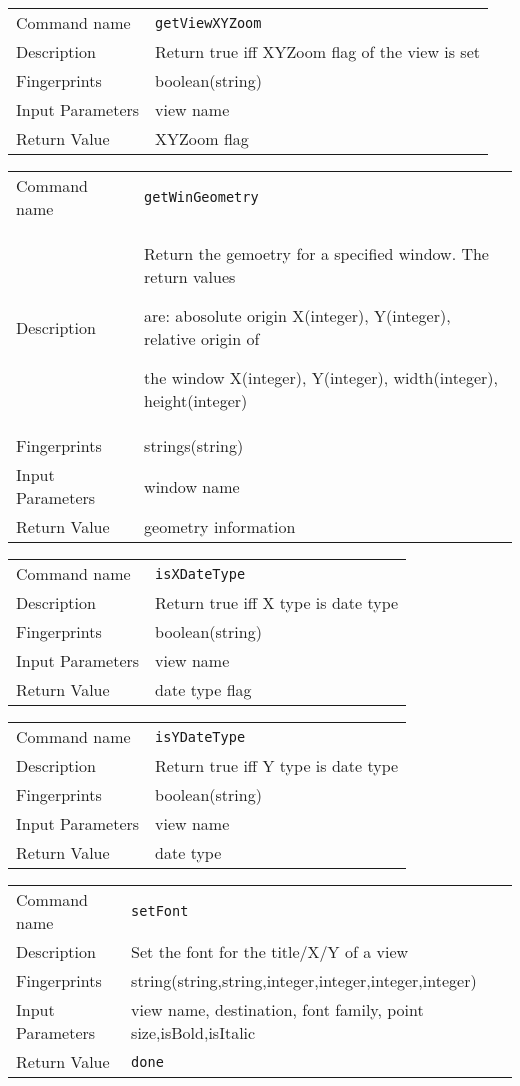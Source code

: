 \noindent
\begin{tabular}{l|p{5in}}
\hline
Command name &{\tt getViewXYZoom }\\ 
Description &
Return true iff XYZoom flag of the view is set
 	\\
Fingerprints & boolean(string)\\
Input Parameters& view name\\
Return Value&XYZoom flag\\
\hline
\end{tabular}
\bigskip

\noindent
\begin{tabular}{l|p{5in}}
\hline
Command name &{\tt getWinGeometry }\\ 
Description &
Return the gemoetry for a specified window. The return values 
 
are: abosolute origin X(integer), Y(integer), relative origin of
 
the window X(integer), Y(integer), width(integer), height(integer)
 	\\
Fingerprints & strings(string)\\
Input Parameters&window name\\
Return Value&geometry information\\
\hline
\end{tabular}
\bigskip

\noindent
\begin{tabular}{l|p{5in}}
\hline
Command name &{\tt isXDateType }\\ 
Description &
Return true iff X type is date type
 	\\
Fingerprints & boolean(string)\\
Input Parameters&view name\\
Return Value&date type flag\\
\hline
\end{tabular}
\bigskip

\noindent
\begin{tabular}{l|p{5in}}
\hline
Command name &{\tt isYDateType }\\ 
Description &
Return true iff Y type is date type
 	\\
Fingerprints & boolean(string)\\
Input Parameters&view name\\
Return Value&date type\\
\hline
\end{tabular}
\bigskip

\noindent
\begin{tabular}{l|p{5in}}
\hline
Command name &{\tt setFont }\\ 
Description &
Set the font for the title/X/Y of a view
 	\\
Fingerprints & string(string,string,integer,integer,integer,integer)\\
Input Parameters&view name, destination, font family, point size,isBold,isItalic\\
Return Value&{\tt done}\\
\hline
\end{tabular}
\bigskip

